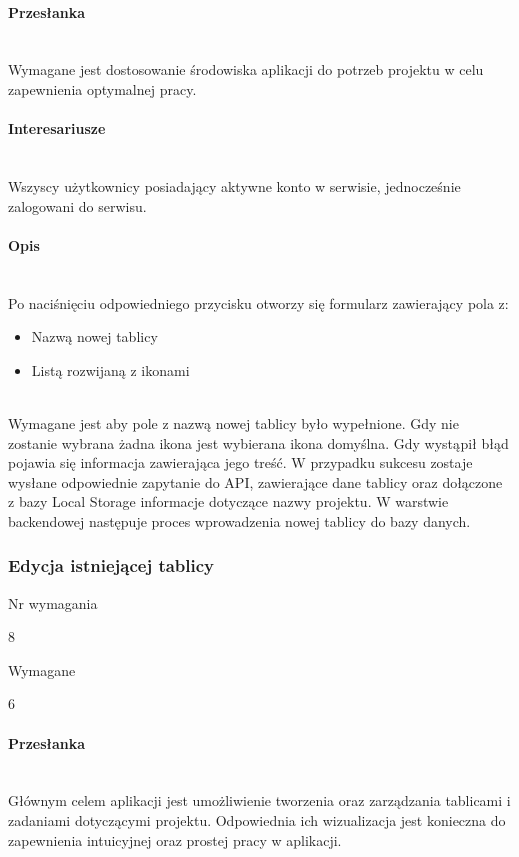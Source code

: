 \documentclass[eng,printmode]{mgr}
\begin{document}
\paragraph{Przesłanka}\ \\
Wymagane jest dostosowanie środowiska aplikacji do potrzeb projektu w celu zapewnienia optymalnej pracy.

\paragraph{Interesariusze}\ \\
Wszyscy użytkownicy posiadający aktywne konto w serwisie, jednocześnie zalogowani do serwisu.

\paragraph{Opis}\ \\
Po naciśnięciu odpowiedniego przycisku otworzy się formularz zawierający pola z:
\begin{itemize}
  \item[--] Nazwą nowej tablicy
  \item[--] Listą rozwijaną z ikonami
\end{itemize}
\ \\
Wymagane jest aby pole z nazwą nowej tablicy było wypełnione. Gdy nie zostanie wybrana żadna ikona jest wybierana ikona domyślna. Gdy wystąpił błąd pojawia się informacja zawierająca jego treść. W przypadku sukcesu zostaje wysłane odpowiednie zapytanie do API, zawierające dane tablicy oraz dołączone z bazy Local Storage informacje dotyczące nazwy projektu. W warstwie backendowej następuje proces wprowadzenia nowej tablicy do bazy danych.
\newpage

\subsubsection{Edycja istniejącej tablicy}
\begin{labeling}{Nr wymagania}
\item [Nr wymagania:] 8
\item [Typ:] Wymagane
\item [Powiązania:] 6
\end{labeling}

\paragraph{Przesłanka}\ \\
Głównym celem aplikacji jest umożliwienie tworzenia oraz zarządzania tablicami i zadaniami dotyczącymi projektu. Odpowiednia ich wizualizacja jest konieczna do zapewnienia intuicyjnej oraz prostej pracy w aplikacji.
\end{document}

